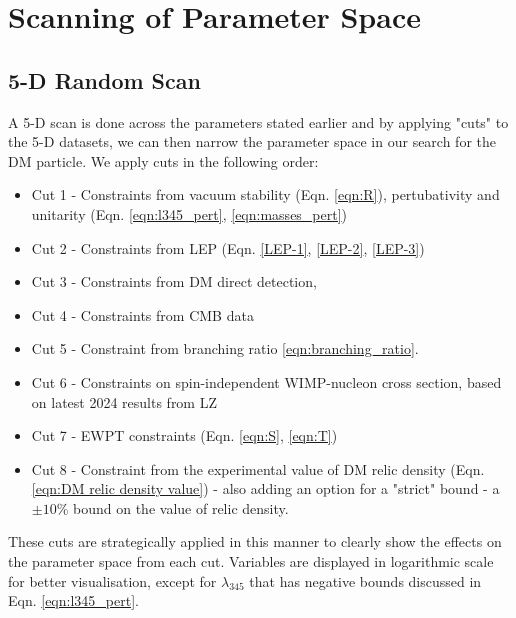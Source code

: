\documentclass[12pt]{article}
\begin{document}
\newpage
\section{Scanning of Parameter Space}
\label{sec:results}
\subsection{5-D Random Scan}
\label{5-D scan}
A 5-D scan is done across the parameters stated earlier and by applying "cuts" to the 5-D datasets, we can then narrow the parameter space in our search for the DM particle.
We apply cuts in the following order:
\begin{itemize}
    \item Cut 1 - Constraints from vacuum stability (Eqn. \ref{eqn:R}), pertubativity and unitarity (Eqn. \ref{eqn:l345_pert}, \ref{eqn:masses_pert}) 
    \item Cut 2 - Constraints from LEP (Eqn. \ref{LEP-1}, \ref{LEP-2}, \ref{LEP-3}) 
    \item Cut 3 - Constraints from DM direct detection, 
    \item Cut 4 - Constraints from CMB data
    \item Cut 5 - Constraint from branching ratio \ref{eqn:branching_ratio}.
    \item Cut 6 - Constraints on spin-independent WIMP-nucleon cross section, based on latest 2024 results from LZ \cite{aalbers2024darkmattersearchresults}
    \item Cut 7 - EWPT constraints (Eqn. \ref{eqn:S}, \ref{eqn:T})
    \item Cut 8 - Constraint from the experimental value of DM relic density (Eqn. \ref{eqn:DM relic density value}) - also adding an option for a "strict" bound - a $\pm 10 \%$ bound on the value of relic density.
\end{itemize}
These cuts are strategically applied in this manner to clearly show the effects on the parameter space from each cut. Variables are displayed in logarithmic scale for better visualisation, except for $\lambda_{345}$ that has negative bounds discussed in Eqn. \ref{eqn:l345_pert}.
\newpage
\end{document}
